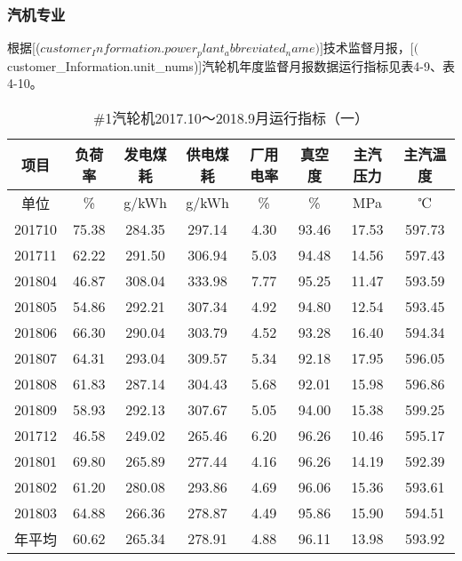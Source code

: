 \documentclass[a4paper, 11pt]{article}
\begin{document}
\subsubsection{汽机专业}
根据[(${customer_Information.power_plant_abbreviated_name})]技术监督月报，  [(${customer_Information.unit_nums})]汽轮机{{年度监督月报数据}}运行指标见表4-9、表4-10。
\begin{table}[H]
\centering
\caption{\#1汽轮机2017.10～2018.9月运行指标（一）}  %
\label{汽轮机2017.10～2018.9月运行指标1}
\begin {tabular}{|c|c|c|c|c|c|c|c|}
\hline
项目&负荷率&发电煤耗&供电煤耗&厂用电率&真空度&主汽压力&主汽温度\\
\hline
单位&\%&g/kWh&g/kWh&\%&\%&MPa&℃\\
\hline
201710&75.38&284.35&297.14&4.30&93.46&17.53&597.73\\
\hline
201711&62.22&291.50&306.94&5.03&94.48&14.56&597.43\\
\hline
201804&46.87&308.04&333.98&7.77&95.25&11.47&593.59\\
\hline
201805&54.86&292.21&307.34&4.92&94.80&12.54&593.45\\
\hline
201806&66.30&290.04&303.79&4.52&93.28&16.40&594.34\\
\hline
201807&64.31&293.04&309.57&5.34&92.18&17.95&596.05\\
\hline
201808&61.83&287.14&304.43&5.68&92.01&15.98&596.86\\
\hline
201809&58.93&292.13&307.67&5.05&94.00&15.38&599.25\\
\hline
201712&46.58&249.02&265.46&6.20&96.26&10.46&595.17\\
\hline
201801&69.80&265.89&277.44&4.16&96.26&14.19&592.39\\
\hline
201802&61.20&280.08&293.86&4.69&96.06&15.36&593.61\\
\hline
201803&64.88&266.36&278.87&4.49&95.86&15.90&594.51\\
\hline
年平均&60.62&265.34&278.91&4.88&96.11&13.98&593.92\\
\hline
\end{tabular}
\end{table}
\end{document}
